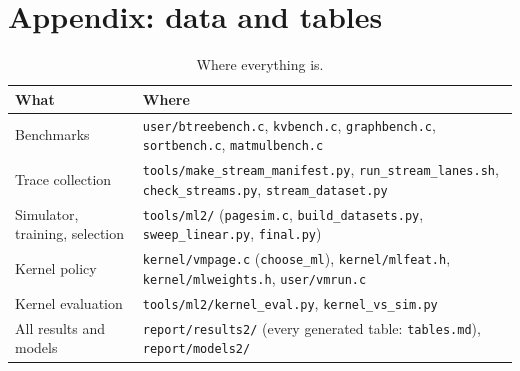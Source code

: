 \documentclass[10.5pt,a4paper]{article}
\newcommand{\code}[1]{\texttt{#1}}
\begin{document}
\section*{Appendix: data and tables}
\renewcommand{\thetable}{A\arabic{table}}
\setcounter{table}{0}

\begin{table}[!htbp]
\centering\small

\caption{The 89 traces. ``Pages'' is the number of distinct pages a trace
touches; memory sizes are 5/10/20\% of it.}
\label{tab:variants}
\end{table}

\begin{table}[!htbp]
\centering\small

\caption{The selected kernel+refault models, chosen on validation. These are
the weights the kernel runs.}
\label{tab:chosen}
\end{table}

\begin{table}[!htbp]
\centering\small

\caption{All in-kernel results: faults relative to Clock at 10\% memory
(kernel counters, geometric mean over traces).}
\label{tab:kernelall}
\end{table}

\begin{table}[!htbp]
\centering\small
\begin{tabularx}{\linewidth}{@{}l>{\raggedright\arraybackslash}X@{}}
\toprule
\textbf{What} & \textbf{Where} \\
\midrule
Benchmarks & \code{user/btreebench.c}, \code{kvbench.c}, \code{graphbench.c}, \code{sortbench.c}, \code{matmulbench.c} \\
Trace collection & \code{tools/make\_stream\_manifest.py}, \code{run\_stream\_lanes.sh}, \code{check\_streams.py}, \code{stream\_dataset.py} \\
Simulator, training, selection & \code{tools/ml2/} (\code{pagesim.c}, \code{build\_datasets.py}, \code{sweep\_linear.py}, \code{final.py}) \\
Kernel policy & \code{kernel/vmpage.c} (\code{choose\_ml}), \code{kernel/mlfeat.h}, \code{kernel/mlweights.h}, \code{user/vmrun.c} \\
Kernel evaluation & \code{tools/ml2/kernel\_eval.py}, \code{kernel\_vs\_sim.py} \\
All results and models & \code{report/results2/} (every generated table: \code{tables.md}), \code{report/models2/} \\
\bottomrule
\end{tabularx}
\caption{Where everything is.}
\end{table}
\end{document}
